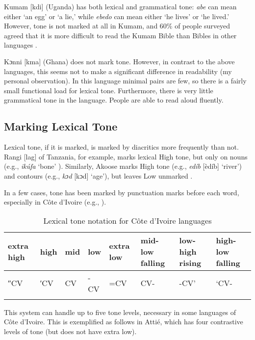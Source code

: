 \documentclass[output=paper]{langscibook}
\begin{document}
    Kumam [kdi] (Uganda) has both lexical and grammatical tone: \textit{abe} can mean either ‘an egg’ or ‘a lie,’ while \textit{ebedo} can mean either ‘he lives’ or ‘he lived.’ However, tone is not marked at all in Kumam, and 60\% of people surveyed agreed that it is more difficult to read the Kumam Bible than Bibles in other languages \citep{Edonyu2015}.

     Kɔnni [kma] (Ghana) does not mark tone. However, in contrast to the above languages, this seems not to make a significant difference in readability (my personal observation). In this language minimal pairs are few, so there is a fairly small functional load for lexical tone. Furthermore, there is very little grammatical tone in the language. People are able to read aloud fluently.

  \subsection{Marking Lexical Tone} 
  \label{sec:HowToneMarked:MarkLexical:2}
    Lexical tone, if it is marked, is marked by diacritics more frequently than not. Rangi [lag] of Tanzania, for example, marks lexical High tone, but only on nouns (e.g., \textit{ikúfa} ‘bone’ \citep{Stegen2005}). Similarly, Akoose marks High tone (e.g., \textit{edíb} [èdíb] ‘river’) and contours (e.g., \textit{kɔd}  [kɔd] ‘age’), but leaves Low unmarked \citep[13]{Hedinger2011}.

    In a few cases, tone has been marked by punctuation marks before each word, especially in Côte d’Ivoire (e.g., \citealt{Bolli1978}). 

    
    \begin{table}
      \begin{tabularx}{\textwidth}{XXXXXXXX}
      \lsptoprule
      extra high & high & mid & low & extra low & mid-low falling & low-high rising & high-low falling\\\midrule
      ″CV & ′CV & CV & {}-CV & =CV & CV- & {}-CV’ & ‘CV-\\
      \lspbottomrule
      \end{tabularx}
      \caption{Lexical tone notation for Côte d’Ivoire languages \citep[58]{Kutsch2014}\label{tab:LexicalToneNotationCoteLang:9}}
    \end{table}

    This system can handle up to five tone levels, necessary in some languages of Côte d’Ivoire. This is exemplified as follows in Attié, which has four contrastive levels of tone (but does not have extra low).
\end{document}
